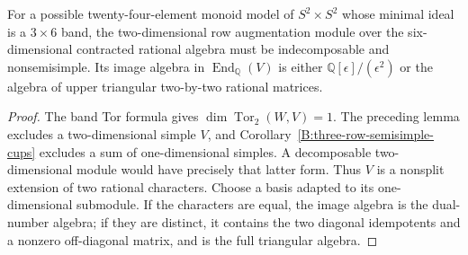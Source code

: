 \begin{corollary}\label{B:three-by-six-order24-row-reduction}
For a possible twenty-four-element monoid model of
$S^2\times S^2$ whose minimal ideal is a $3\times6$ band,
the two-dimensional row augmentation module over the
six-dimensional contracted rational algebra must be
indecomposable and nonsemisimple.  Its image algebra in
$\operatorname{End}_{\mathbb Q}(V)$ is either
$\mathbb Q[\epsilon]/(\epsilon^2)$ or the algebra of upper
triangular two-by-two rational matrices.
\end{corollary}
\begin{proof}
The band Tor formula gives $\dim\operatorname{Tor}_2(W,V)=1$.
The preceding lemma excludes a two-dimensional simple $V$,
and Corollary~\ref{B:three-row-semisimple-cups} excludes a sum
of one-dimensional simples.  A decomposable two-dimensional
module would have precisely that latter form.  Thus $V$ is a
nonsplit extension of two rational characters.  Choose a basis
adapted to its one-dimensional submodule.  If the characters
are equal, the image algebra is the dual-number algebra; if
they are distinct, it contains the two diagonal idempotents
and a nonzero off-diagonal matrix, and is the full triangular
algebra.
\end{proof}

